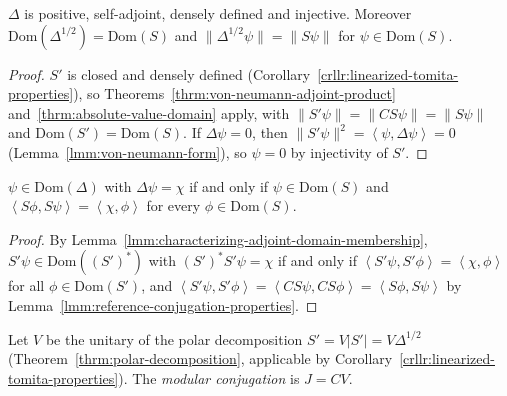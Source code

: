 \begin{theorem}
    \label{thrm:modular-operator-properties}
    \leanok
    $\Delta$ is positive, self-adjoint, densely defined and injective. Moreover $\text{Dom}(\Delta^{1/2}) = \text{Dom}(S)$ and $\|\Delta^{1/2}\psi\| = \|S\psi\|$ for $\psi \in \text{Dom}(S)$.
\end{theorem}
\begin{proof}
    \leanok
    $S'$ is closed and densely defined (Corollary~\ref{crllr:linearized-tomita-properties}), so Theorems~\ref{thrm:von-neumann-adjoint-product} and~\ref{thrm:absolute-value-domain} apply, with $\|S'\psi\| = \|CS\psi\| = \|S\psi\|$ and $\text{Dom}(S') = \text{Dom}(S)$. If $\Delta\psi = 0$, then $\|S'\psi\|^2 = \left< \psi, \Delta\psi \right> = 0$ (Lemma~\ref{lmm:von-neumann-form}), so $\psi = 0$ by injectivity of $S'$.
\end{proof}

\begin{lemma}
    \label{lmm:modular-operator-intrinsic}
    \leanok
    $\psi \in \text{Dom}(\Delta)$ with $\Delta\psi = \chi$ if and only if $\psi \in \text{Dom}(S)$ and $\left< S\phi, S\psi \right> = \left< \chi, \phi \right>$ for every $\phi \in \text{Dom}(S)$.
\end{lemma}
\begin{proof}
    \leanok
    By Lemma~\ref{lmm:characterizing-adjoint-domain-membership}, $S'\psi \in \text{Dom}((S')^*)$ with $(S')^*S'\psi = \chi$ if and only if $\left< S'\psi, S'\phi \right> = \left< \chi, \phi \right>$ for all $\phi \in \text{Dom}(S')$, and $\left< S'\psi, S'\phi \right> = \left< CS\psi, CS\phi \right> = \left< S\phi, S\psi \right>$ by Lemma~\ref{lmm:reference-conjugation-properties}.
\end{proof}

\begin{definition}
    \label{def:modular-conjugation}
    \leanok
    Let $V$ be the unitary of the polar decomposition $S' = V|S'| = V\Delta^{1/2}$ (Theorem~\ref{thrm:polar-decomposition}, applicable by Corollary~\ref{crllr:linearized-tomita-properties}). The \emph{modular conjugation} is $J = CV$.
\end{definition}

